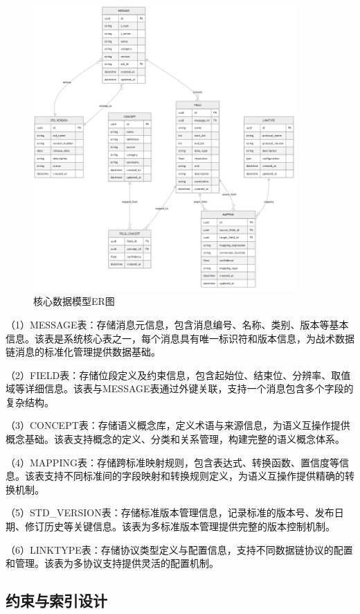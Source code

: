 \begin{figure}[H]
    \centering
    \includegraphics[width=0.9\textwidth]{chapters/fig-0/data_model.png}
    \caption{核心数据模型ER图}
    \label{fig:data_model}
\end{figure}

（1）MESSAGE表：存储消息元信息，包含消息编号、名称、类别、版本等基本信息。该表是系统核心表之一，每个消息具有唯一标识符和版本信息，为战术数据链消息的标准化管理提供数据基础。

（2）FIELD表：存储位段定义及约束信息，包含起始位、结束位、分辨率、取值域等详细信息。该表与MESSAGE表通过外键关联，支持一个消息包含多个字段的复杂结构。

（3）CONCEPT表：存储语义概念库，定义术语与来源信息，为语义互操作提供概念基础。该表支持概念的定义、分类和关系管理，构建完整的语义概念体系。

（4）MAPPING表：存储跨标准映射规则，包含表达式、转换函数、置信度等信息。该表支持不同标准间的字段映射和转换规则定义，为语义互操作提供精确的转换机制。

（5）STD\_VERSION表：存储标准版本管理信息，记录标准的版本号、发布日期、修订历史等关键信息。该表为多标准版本管理提供完整的版本控制机制。

（6）LINKTYPE表：存储协议类型定义与配置信息，支持不同数据链协议的配置和管理。该表为多协议支持提供灵活的配置机制。

\subsection{约束与索引设计}

